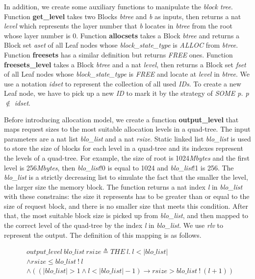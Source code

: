 In addition, we create some auxiliary functions to manipulate the \textsl{block tree}. Function \textbf{get\_level} takes two Blocks \emph{btree} and \emph{b} as inputs, then returns a nat \emph{level} which represents the layer number that \emph{b} locates in \emph{btree} from the root whose layer number is 0. Function \textbf{allocsets} takes a Block \emph{btree} and returns a Block set \emph{aset} of all Leaf nodes whose \emph{block\_state\_type} is \emph{ALLOC} from \emph{btree}. Function \textbf{freesets} has a similar definition but returns \emph{FREE} ones. Function \textbf{freesets\_level} takes a Block \emph{btree} and a nat \emph{level}, then returns a Block set \emph{fset} of all Leaf nodes whose \emph{block\_state\_type} is \emph{FREE} and locate at \emph{level} in \emph{btree}. We use a notation \emph{idset} to represent the collection of all used \emph{IDs}. To create a new Leaf node, we have to pick up a new \emph{ID} to mark it by the strategy of \emph{SOME p. p} $\notin$ \emph{idset}.

Before introducing allocation model, we create a function \textbf{output\_level} that maps request sizes to the most suitable allocation levels in a quad-tree. The input parameters are a nat list \emph{blo\_list} and a nat \emph{rsize}. Static linked list \emph{blo\_list} is used to store the size of blocks for each level in a quad-tree and its indexes represent the levels of a quad-tree. For example, the size of root is 1024\emph{Mbytes} and the first level is 256\emph{Mbytes}, then \emph{blo\_list}!0 is equal to 1024 and \emph{blo\_list}!1 is 256. The \emph{blo\_list} is a strictly decreasing list to simulate the fact that the smaller the level, the larger size the memory block. The function returns a nat index \emph{l} in \emph{blo\_list} with these constrains: the size it represents has to be greater than or equal to the size of request block, and there is no smaller size that meets this condition. After that, the most suitable block size is picked up from \emph{blo\_list}, and then mapped to the correct level of the quad-tree by the index \emph{l} in \emph{blo\_list}. We use \emph{rlv} to represent the output. The definition of this mapping is as follows.

\begin{definition} 
\label{mostsuitable}
\end{definition}
\vspace{-7pt}
{\footnotesize
\begin{align*}
&output\_level\ blo\_list\ rsize \triangleq THE\ l.\ l < \vert blo\_list \vert \\
&\wedge rsize \le blo\_list\ !\ l \\
&\wedge ((\vert blo\_list \vert > 1 \wedge l < \vert blo\_list \vert - 1) \longrightarrow rsize > blo\_list\ !\ (l+1))
\end{align*}
}
\vspace{-17pt}

